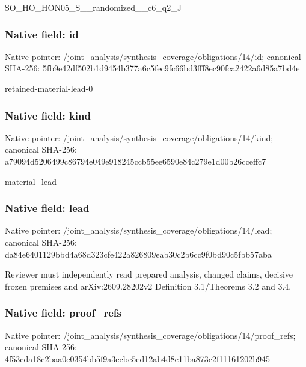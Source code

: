 \documentclass[10pt,a4paper]{article}
\begin{document}
\begingroup\raggedright\sloppy SO\_\allowbreak{}HO\_\allowbreak{}HON05\_\allowbreak{}S\_\allowbreak{}\_\allowbreak{}randomized\_\allowbreak{}\_\allowbreak{}c6\_\allowbreak{}q2\_\allowbreak{}J\par\endgroup

\subsubsection{Native field: id}
Native pointer: /joint\_\allowbreak{}analysis/synthesis\_\allowbreak{}coverage/obligations/14/id; canonical SHA-256: 5fb9e42df502b1d9454b377a6c5fec9fc66bd3fff8ec90fca2422a6d85a7bd4e

\begingroup\raggedright\sloppy retained-material-lead-0\par\endgroup

\subsubsection{Native field: kind}
Native pointer: /joint\_\allowbreak{}analysis/synthesis\_\allowbreak{}coverage/obligations/14/kind; canonical SHA-256: a79094d5206499c86794e049e918245ccb55ee6590e84c279e1d00b26cceffc7

\begingroup\raggedright\sloppy material\_\allowbreak{}lead\par\endgroup

\subsubsection{Native field: lead}
Native pointer: /joint\_\allowbreak{}analysis/synthesis\_\allowbreak{}coverage/obligations/14/lead; canonical SHA-256: da84e6401129bbd4a68d323cfe422a826809eab30c2b6cc9f0bd90c5fbb57aba

\begingroup\raggedright\sloppy Reviewer must independently read prepared analysis,\allowbreak{} changed claims,\allowbreak{} decisive frozen premises and arXiv:\allowbreak{}2609.28202v2 Definition 3.1/\allowbreak{}Theorems 3.2 and 3.4.\par\endgroup

\subsubsection{Native field: proof\_\allowbreak{}refs}
Native pointer: /joint\_\allowbreak{}analysis/synthesis\_\allowbreak{}coverage/obligations/14/proof\_\allowbreak{}refs; canonical SHA-256: 4f53cda18c2baa0c0354bb5f9a3ecbe5ed12ab4d8e11ba873c2f11161202b945
\end{document}
